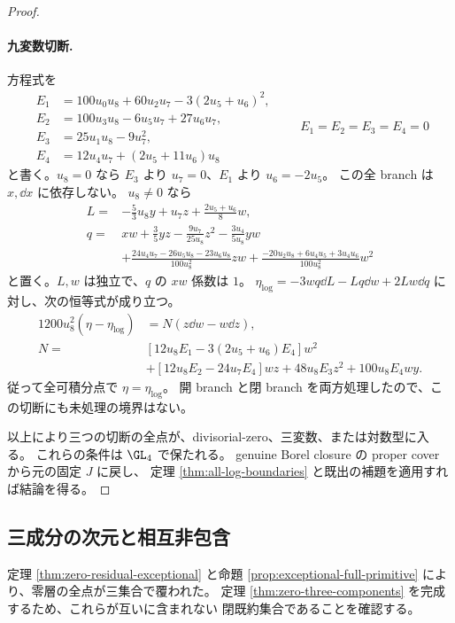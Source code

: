 \begin{proof}
\paragraph{九変数切断.}
方程式を
\[
\begin{split}
 E_1&=100u_0u_8+60u_2u_7-3(2u_5+u_6)^2,\\
 E_2&=100u_3u_8-6u_5u_7+27u_6u_7,\\
 E_3&=25u_1u_8-9u_7^2,\\
 E_4&=12u_4u_7+(2u_5+11u_6)u_8
\end{split}\qquad E_1=E_2=E_3=E_4=0                         \tag{Z17}
\]
と書く。$u_8=0$ なら $E_3$ より $u_7=0$、$E_1$ より $u_6=-2u_5$。
この全 branch は $x,\dd x$ に依存しない。
$u_8\ne0$ なら
\[
\begin{split}
 L={}&-\frac53u_8y+u_7z+\frac{2u_5+u_6}{8}w,\\
 q={}&xw+\frac35yz-\frac{9u_7}{25u_8}z^2-\frac{3u_4}{5u_8}yw\\
    &+\frac{24u_4u_7-26u_5u_8-23u_6u_8}{100u_8^2}zw
     +\frac{-20u_2u_8+6u_4u_5+3u_4u_6}{100u_8^2}w^2
\end{split}\tag{Z18}
\]
と置く。$L,w$ は独立で、$q$ の $xw$ 係数は $1$。
$\eta_{\log}=-3wq\dd L-Lq\dd w+2Lw\dd q$ に対し、次の恒等式が成り立つ。
\[
\begin{split}
 1200u_8^2(\eta-\eta_{\log})&=N(z\dd w-w\dd z),\\
 N={}&[12u_8E_1-3(2u_5+u_6)E_4]w^2\\
     &+[12u_8E_2-24u_7E_4]wz+48u_8E_3z^2+100u_8E_4wy.
\end{split}\tag{Z19}
\]
従って全可積分点で $\eta=\eta_{\log}$。
開 branch と閉 branch を両方処理したので、この切断にも未処理の境界はない。

以上により三つの切断の全点が、divisorial-zero、三変数、または対数型に入る。
これらの条件は $\GL_4$ で保たれる。
genuine Borel closure の proper cover から元の固定 $J$ に戻し、
定理 \ref{thm:all-log-boundaries} と既出の補題を適用すれば結論を得る。
\end{proof}

\subsection{三成分の次元と相互非包含}

定理 \ref{thm:zero-residual-exceptional} と命題 \ref{prop:exceptional-full-primitive}
により、零層の全点が三集合で覆われた。
定理 \ref{thm:zero-three-components} を完成するため、これらが互いに含まれない
閉既約集合であることを確認する。

